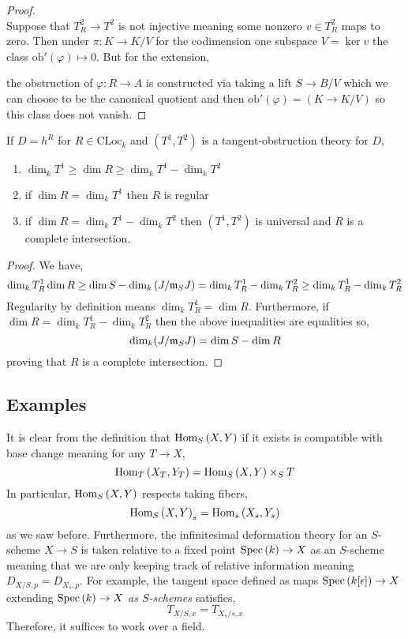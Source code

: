 \documentclass[12pt]{article}
\newcommand{\CLoc}{\mathrm{CLoc}}
\newcommand{\ob}{\mathrm{ob}}
\begin{document}
\begin{proof}
\bigskip\\
Suppose that $T^2_R \to T^2$ is not injective meaning some nonzero $v \in T^2_R$ maps to zero. Then under $\pi : K \to K / V$ for the codimension one subspace $V = \ker{v}$ the class $\ob'(\varphi) \mapsto 0$. But for the extension,
\begin{center}
\end{center}
the obstruction of $\varphi : R \to A$ is constructed via taking a lift $S \to B / V$ which we can choose to be the canonical quotient and then $\ob'(\varphi) = (K \to K / V)$ so this class does not vanish. 
\end{proof}

\begin{cor}
If $D = h^R$ for $R \in \CLoc_k$ and $(T^1, T^2)$ is a tangent-obstruction theory for $D$,
\begin{enumerate}
\item $\dim_k T^1 \ge \dim{R} \ge \dim_k T^1 - \dim_k T^2$
\item if $\dim{R} = \dim_k T^1$ then $R$ is regular
\item if $\dim{R} = \dim_k T^1 - \dim_k T^2$ then $(T^1, T^2)$ is universal and $R$ is a complete intersection.
\end{enumerate}
\end{cor}

\begin{proof}
We have,
\[ \dim_k T^1_R \dim{R} \ge \dim{S} - \dim_k {(J / \mathfrak{m}_S J)} = \dim_k T^1_R - \dim_k T^2_R \ge \dim_k T^1_R - \dim_k T^2_R \]
Regularity by definition means $\dim_k T^1_R = \dim{R}$. Furthermore, if $\dim{R} = \dim_k T^1_R - \dim_k T^2_R$ then the above inequalities are equalities so,
\[ \dim_k (J / \mathfrak{m}_S J) = \dim{S} - \dim{R} \]
proving that $R$ is a complete intersection.
\end{proof}

\subsection{Examples}

\begin{rmk}
It is clear from the definition that $\mathrm{Hom}_{S} \left( X, Y \right)$ if it exists is compatible with base change meaning for any $T \to X$,
\[ \mathrm{Hom}_{T} \left( X_T, Y_T \right) = \mathrm{Hom}_{S} \left( X, Y \right) \times_S T \]
In particular, $\mathrm{Hom}_{S} \left( X, Y \right)$ respects taking fibers,
\[ \mathrm{Hom}_{S} \left( X, Y \right)_s = \mathrm{Hom}_{s} \left( X_s, Y_s \right) \]
as we saw before. Furthermore, the infinitesimal deformation theory for an $S$-scheme $X \to S$ is taken relative to a fixed point $\mathrm{Spec}\left( k \right) \to X$ as an $S$-scheme meaning that we are only keeping track of relative information meaning $D_{X/S,p} = D_{X_s, p}$. For example, the tangent space defined as maps $\mathrm{Spec}\left( k[\epsilon] \right) \to X$ extending $\mathrm{Spec}\left( k \right) \to X$ \textit{as $S$-schemes} satisfies,
\[ T_{X/S,x} = T_{X_s/s,x} \]
Therefore, it suffices to work over a field.
\end{rmk}
\end{document}
